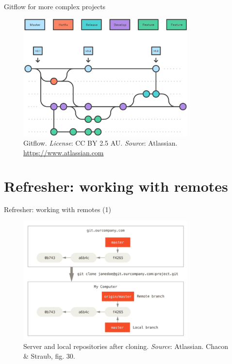 \documentclass[handout]{beamer}
\begin{document}
\begin{frame}{Gitflow for more complex projects}
\begin{figure}
	\includegraphics[width=0.8\textwidth]{figures/gitflow.pdf}
	\caption{Gitflow. \textit{License}: CC BY 2.5 AU. \textit{Source}: Atlassian. \href{https://www.atlassian.com/git/tutorials/comparing-workflows/gitflow-workflow}{https://www.atlassian.com}}
\end{figure}
\end{frame}

\section{Refresher: working with remotes}

\begin{frame}{Refresher: working with remotes (1)}
\begin{figure}
	\includegraphics[width=0.8\textwidth]{figures/fig30_clone.png}
	\caption{Server and local repositories after cloning. \textit{Source}: Atlassian. Chacon \& Straub, fig. 30.}
\end{figure}
\end{frame}
\end{document}
